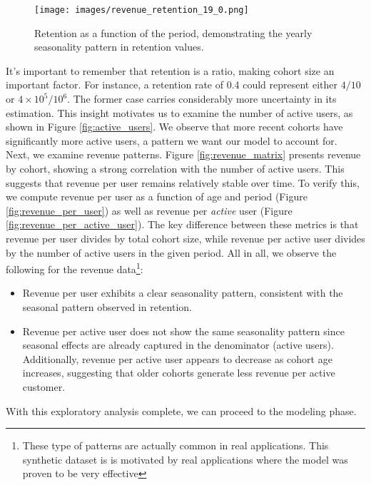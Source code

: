 \documentclass[11pt]{amsart}
\theoremstyle{definition}
\begin{document}
\begin{figure}
    \centering
    \texttt{[image: images/revenue\_retention\_19\_0.png]}
    \caption{Retention as a function of the period, demonstrating the yearly seasonality pattern in retention values.}
    \label{fig:retention_seasonal}
\end{figure}

It's important to remember that retention is a ratio, making cohort size an important factor. For instance, a retention rate
of 0.4 could represent either $4/10$ or $4\times 10^{5} / 10^{6}$. The former case carries considerably more uncertainty in
its estimation. This insight motivates us to examine the number of active users, as shown in Figure \ref{fig:active_users}.
We observe that more recent cohorts have significantly more active users, a pattern we want our model to account for. \\

Next, we examine revenue patterns. Figure \ref{fig:revenue_matrix} presents revenue by cohort, showing a strong correlation with the
number of active users. This suggests that revenue per user remains relatively stable over time. To verify this, we compute
revenue per user as a function of age and period (Figure \ref{fig:revenue_per_user}) as well as revenue per {\em active} user
(Figure \ref{fig:revenue_per_active_user}). The key difference between these metrics is that revenue per user divides by
total cohort size, while revenue per active user divides by the number of active users in the given period. All in all,
we observe the following for the revenue data\footnote{These type of patterns are actually common in real applications. This synthetic
    dataset is is motivated by real applications where the model was proven to be very effective}:

\begin{itemize}
    \item Revenue per user exhibits a clear seasonality pattern, consistent with the seasonal pattern observed in retention.
    \item Revenue per active user does not show the same seasonality pattern since seasonal effects are already captured in
          the denominator (active users). Additionally, revenue per active user appears to decrease as cohort age increases,
          suggesting that older cohorts generate less revenue per active customer. \\
\end{itemize}

With this exploratory analysis complete, we can proceed to the modeling phase.
\end{document}
